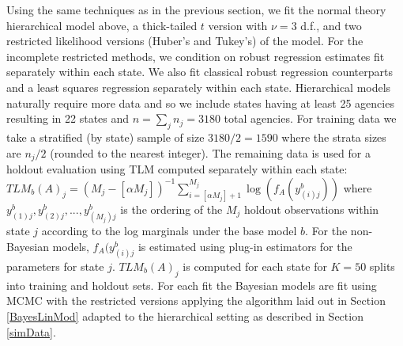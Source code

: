 \documentclass[ba]{imsart}
\begin{document}
Using the same techniques as in the previous section, 
we fit the normal theory hierarchical model above, a thick-tailed $t$ version with $\nu = 3$ d.f., and two restricted likelihood versions (Huber's and Tukey's) of the model.  For the incomplete restricted methods, we condition on robust regression estimates fit separately within each state. We also fit classical robust regression counterparts and a least squares regression separately within each state. Hierarchical models naturally require more
data and so we include states having at least 25 agencies resulting in 22 states and $n = \sum_{j} n_{j} =  3180$ total agencies. For training data we take a stratified (by state) sample of size $3180/2 = 1590$ where the strata sizes are $n_{j}/2$ (rounded to the nearest integer). The remaining data is used for a holdout evaluation using TLM computed separately within each state: $TLM_b(A)_{j} = (M_{j} - [\alpha M_{j}])^{-1} \sum_{i=[\alpha M_{j}]+1}^{M_{j}} \log(f_A(y_{(i)j}^b))$ where $y_{(1)j}^b, y_{(2)j}^b,..., y_{(M_{j})j}^b$ is the ordering of the $M_{j}$ holdout observations within state $j$ according to the log marginals under the base model $b$. For the non-Bayesian models,  $f_A(y_{(i)j}^b$ is estimated using plug-in estimators for the parameters for state $j$. $TLM_b(A)_{j}$ is computed for each state for $K=50$ splits into training and holdout sets. For each fit the Bayesian models are fit using MCMC with the restricted versions applying the algorithm laid out in Section \ref{BayesLinMod} adapted to the hierarchical setting as described in Section \ref{simData}.

\end{document}
